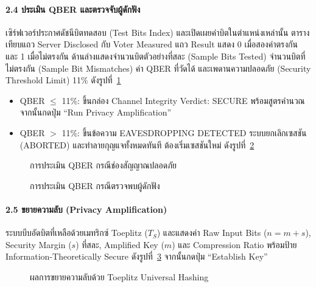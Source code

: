 \paragraph{2.4 ประเมิน QBER และตรวจจับผู้ดักฟัง}
เซิร์ฟเวอร์ประกาศดัชนีบิตทดสอบ (Test Bits Index) และเปิดเผยค่าบิตในตำแหน่งเหล่านั้น
ตารางเทียบแถว Server Disclosed กับ Voter Measured
แถว Result แสดง 0 เมื่อสองค่าตรงกัน และ 1 เมื่อไม่ตรงกัน
ด้านล่างแสดงจำนวนบิตตัวอย่างที่สละ (Sample Bits Tested) จำนวนบิตที่ไม่ตรงกัน (Sample Bit Mismatches)
ค่า QBER ที่วัดได้ และเพดานความปลอดภัย (Security Threshold Limit) 11\%
ดังรูปที่~\ref{fig:manual-qber}
\begin{itemize}
  \item QBER $\le$ 11\%: ขึ้นกล่อง Channel Integrity Verdict: SECURE พร้อมสูตรคำนวณ
        จากนั้นกดปุ่ม ``Run Privacy Amplification''
  \item QBER $>$ 11\%: ขึ้นข้อความ EAVESDROPPING DETECTED ระบบยกเลิกเซสชัน (ABORTED)
        และทำลายกุญแจทั้งหมดทันที ต้องเริ่มเซสชันใหม่ ดังรูปที่~\ref{fig:manual-qber-eve}
\end{itemize}

\begin{figure}[htbp]
\centering
{}
\caption{การประเมิน QBER กรณีช่องสัญญาณปลอดภัย}
\label{fig:manual-qber}
\end{figure}

\begin{figure}[htbp]
\centering
\caption{การประเมิน QBER กรณีตรวจพบผู้ดักฟัง}
\label{fig:manual-qber-eve}
\end{figure}

\paragraph{2.5 ขยายความลับ (Privacy Amplification)}
ระบบบีบอัดบิตที่เหลือด้วยเมทริกซ์ Toeplitz ($T_S$) และแสดงค่า Raw Input Bits ($n = m + s$),
Security Margin ($s$) ที่สละ, Amplified Key ($m$) และ Compression Ratio
พร้อมป้าย Information-Theoretically Secure ดังรูปที่~\ref{fig:manual-pa}
จากนั้นกดปุ่ม ``Establish Key''

\begin{figure}[htbp]
\centering
{}
\caption{ผลการขยายความลับด้วย Toeplitz Universal Hashing}
\label{fig:manual-pa}
\end{figure}

